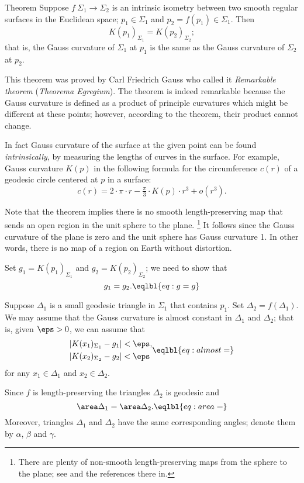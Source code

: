 \begin{thm}{Theorem}\label{thm:remarkable}
Suppose $f\:\Sigma_1\to \Sigma_2$ is an intrinsic isometry between two smooth regular surfaces in  the Euclidean space; $p_1\in \Sigma_1$ and $p_2=f(p_1)\in \Sigma_1$.
Then 
\[K(p_1)_{\Sigma_1}=K(p_2)_{\Sigma_2};\]
that is, the Gauss curvature of $\Sigma_1$ at $p_1$ is the same as the Gauss curvature of $\Sigma_2$ at $p_2$.
\end{thm}

This theorem was proved by Carl Friedrich Gauss \cite{gauss} who called it \emph{Remarkable theorem} (\emph{Theorema Egregium}).
The theorem is indeed remarkable because the Gauss curvature is defined as a product of principle curvatures which might be different at these points; however, according to the theorem, their product cannot change.

In fact Gauss curvature of the surface at the given point can be found {}\emph{intrinsically},
by measuring the lengths of curves in the surface.
For example, Gauss curvature $K(p)$ in the following formula for the circumference $c(r)$ of a geodesic circle centered at $p$ in a surface: 
\[c(r)=2\cdot\pi\cdot r-\tfrac\pi3\cdot K(p)\cdot r^3+o(r^3).\]

Note that the theorem implies there is no smooth length-preserving map that sends an open region in the unit sphere to the plane.%
\footnote{There are plenty of non-smooth length-preserving maps from the sphere to the plane; see \cite{petrunin-yashinski} and the references there in.}
It follows since the Gauss curvature of the plane is zero and the unit sphere has Gauss curvature 1. 
In other words, there is no map of a region on Earth without distortion.

Set $g_1=K(p_1)_{\Sigma_1}$ and $g_2=K(p_2)_{\Sigma_2}$;
we need to show that 
\[g_1=g_2.\eqlbl{eq:g=g}\]

Suppose $\Delta_1$ is a small geodesic triangle in $\Sigma_1$ that contains $p_1$.
Set $\Delta_2=f(\Delta_1)$.
We may assume that the Gauss curvature is almost constant in $\Delta_1$ and $\Delta_2$;
that is, given $\eps>0$, we can assume that 
\[
\begin{aligned}
|K(x_1)_{\Sigma_1}-g_1|&<\eps,
\\
|K(x_2)_{\Sigma_2}-g_2|&<\eps
\end{aligned}
\eqlbl{eq:almost=}\]
for any $x_1\in \Delta_1$ and $x_2\in \Delta_2$.

Since $f$ is length-preserving the triangles $\Delta_2$ is geodesic and
\[\area\Delta_1=\area\Delta_2.\eqlbl{eq:area=}\]
Moreover, triangles $\Delta_1$ and $\Delta_2$ have the same corresponding angles; denote them by $\alpha$, $\beta$ and $\gamma$.

